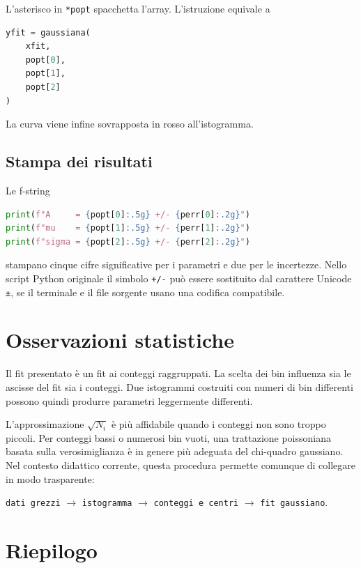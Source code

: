 L'asterisco in \texttt{*popt} spacchetta l'array. L'istruzione equivale a

\begin{lstlisting}[language=Python]
yfit = gaussiana(
    xfit,
    popt[0],
    popt[1],
    popt[2]
)
\end{lstlisting}

La curva viene infine sovrapposta in rosso all'istogramma.

\subsection{Stampa dei risultati}

Le f-string

\begin{lstlisting}[language=Python]
print(f"A     = {popt[0]:.5g} +/- {perr[0]:.2g}")
print(f"mu    = {popt[1]:.5g} +/- {perr[1]:.2g}")
print(f"sigma = {popt[2]:.5g} +/- {perr[2]:.2g}")
\end{lstlisting}

stampano cinque cifre significative per i parametri e due per le
incertezze. Nello script Python originale il simbolo \texttt{+/-} può
essere sostituito dal carattere Unicode \texttt{±}, se il terminale e il
file sorgente usano una codifica compatibile.

\section{Osservazioni statistiche}

Il fit presentato è un fit ai conteggi raggruppati. La scelta dei bin
influenza sia le ascisse del fit sia i conteggi. Due istogrammi costruiti
con numeri di bin differenti possono quindi produrre parametri
leggermente differenti.

L'approssimazione $\sqrt{N_i}$ è più affidabile quando i conteggi non
sono troppo piccoli. Per conteggi bassi o numerosi bin vuoti, una
trattazione poissoniana basata sulla verosimiglianza è in genere più
adeguata del chi-quadro gaussiano. Nel contesto didattico corrente,
questa procedura permette comunque di collegare in modo trasparente:

\begin{center}
\texttt{dati grezzi}
$\longrightarrow$
\texttt{istogramma}
$\longrightarrow$
\texttt{conteggi e centri}
$\longrightarrow$
\texttt{fit gaussiano}.
\end{center}

\section{Riepilogo}

